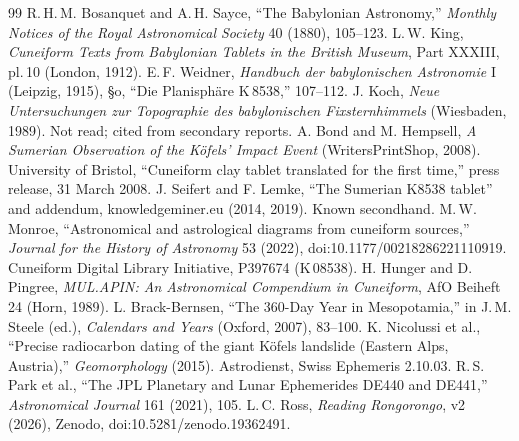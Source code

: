 \documentclass[11pt]{article}
\begin{document}
\begin{thebibliography}{99}\small\setlength{\itemsep}{1pt}
 R.\,H.\,M. Bosanquet and A.\,H. Sayce, ``The Babylonian Astronomy,'' \emph{Monthly Notices of the Royal Astronomical Society} 40 (1880), 105--123.
 L.\,W. King, \emph{Cuneiform Texts from Babylonian Tablets in the British Museum}, Part XXXIII, pl.\,10 (London, 1912).
 E.\,F. Weidner, \emph{Handbuch der babylonischen Astronomie} I (Leipzig, 1915), §o, ``Die Planisphäre K\,8538,'' 107--112.
 J. Koch, \emph{Neue Untersuchungen zur Topographie des babylonischen Fixsternhimmels} (Wiesbaden, 1989). Not read; cited from secondary reports.
 A. Bond and M. Hempsell, \emph{A Sumerian Observation of the Köfels' Impact Event} (WritersPrintShop, 2008).
 University of Bristol, ``Cuneiform clay tablet translated for the first time,'' press release, 31 March 2008.
 J. Seifert and F. Lemke, ``The Sumerian K8538 tablet'' and addendum, knowledgeminer.eu (2014, 2019). Known secondhand.
 M.\,W. Monroe, ``Astronomical and astrological diagrams from cuneiform sources,'' \emph{Journal for the History of Astronomy} 53 (2022), doi:10.1177/00218286221110919.
 Cuneiform Digital Library Initiative, P397674 (K\,08538).
 H. Hunger and D. Pingree, \emph{MUL.APIN: An Astronomical Compendium in Cuneiform}, AfO Beiheft 24 (Horn, 1989).
 L. Brack-Bernsen, ``The 360-Day Year in Mesopotamia,'' in J.\,M. Steele (ed.), \emph{Calendars and Years} (Oxford, 2007), 83--100.
 K. Nicolussi et al., ``Precise radiocarbon dating of the giant Köfels landslide (Eastern Alps, Austria),'' \emph{Geomorphology} (2015).
 Astrodienst, Swiss Ephemeris 2.10.03.
 R.\,S. Park et al., ``The JPL Planetary and Lunar Ephemerides DE440 and DE441,'' \emph{Astronomical Journal} 161 (2021), 105.
 L.\,C. Ross, \emph{Reading Rongorongo}, v2 (2026), Zenodo, doi:10.5281/zenodo.19362491.
\end{thebibliography}
\end{document}
